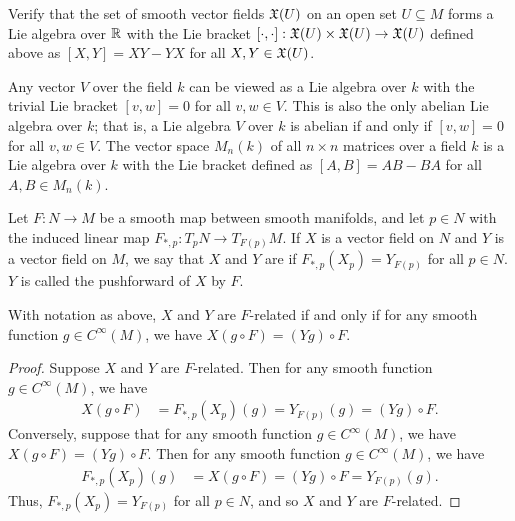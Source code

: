 Verify that the set of smooth vector fields $\mathfrak{X}(U)$ on an open set $U \subseteq M$ forms a Lie algebra over $\mathbb{R}$ with the Lie bracket $[\cdot,\cdot]:\mathfrak{X}(U) \times \mathfrak{X}(U) \to \mathfrak{X}(U)$ defined above as $[X,Y] = XY - YX$ for all $X,Y \in \mathfrak{X}(U)$.

Any vector $V$ over the field $k$ can be viewed as a Lie algebra over $k$ with the trivial Lie bracket $[v,w] = 0$ for all $v,w \in V$. This is also the only abelian Lie algebra over $k$; that is, a Lie algebra $V$ over $k$ is abelian if and only if $[v,w] = 0$ for all $v,w \in V$. The vector space $M_{n}(k)$ of all $n \times n$ matrices over a field $k$ is a Lie algebra over $k$ with the Lie bracket defined as $[A,B] = AB - BA$ for all $A,B \in M_{n}(k)$. 

\begin{definition}
    Let $F:N \to M$ be a smooth map between smooth manifolds, and let $p \in N$ with the induced linear map $F_{\ast,p}:T_{p}N \to T_{F(p)}M$. If $X$ is a vector field on $N$ and $Y$ is a vector field on $M$, we say that $X$ and $Y$ are  if $F_{\ast,p}(X_{p}) = Y_{F(p)}$ for all $p \in N$. $Y$ is called the pushforward of $X$ by $F$.
\end{definition}

\begin{lemma}
    With notation as above, $X$ and $Y$ are $F$-related if and only if for any smooth function $g \in C^{\infty}(M)$, we have $X(g \circ F) = (Yg) \circ F$.
\end{lemma}

\begin{proof}
    Suppose $X$ and $Y$ are $F$-related. Then for any smooth function $g \in C^{\infty}(M)$, we have
    \begin{align*}
        X(g \circ F) &= F_{\ast,p}(X_p)(g) = Y_{F(p)}(g) = (Yg) \circ F.
    \end{align*}
    Conversely, suppose that for any smooth function $g \in C^{\infty}(M)$, we have $X(g \circ F) = (Yg) \circ F$. Then for any smooth function $g \in C^{\infty}(M)$, we have
    \begin{align*}
        F_{\ast,p}(X_p)(g) &= X(g \circ F) = (Yg) \circ F = Y_{F(p)}(g).
    \end{align*}
    Thus, $F_{\ast,p}(X_p) = Y_{F(p)}$ for all $p \in N$, and so $X$ and $Y$ are $F$-related.
\end{proof}


